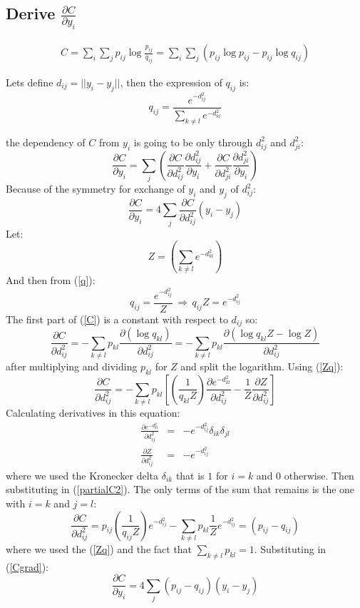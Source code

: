 \documentclass{article}
\begin{document}
\subsection{Derive $\frac{\partial C}{\partial y_{i}}$}
\begin{align}
\label{C}
C=\sum_i\sum_j p_{ij}\log \frac{p_{ij}}{q_{ij}}= \sum_i\sum_j (p_{ij}\log p_{ij}-p_{ij}\log q_{ij})
\end{align}

Lets define $d_{ij}=|| y_i -y_j ||$, then the expression of $q_{ij}$ is:
\begin{equation}\label{q}
q_{ij} =\frac{e^{-d_{ij}^2}}{\sum_{k\neq l} e^{-d_{kl}^2}}
\end{equation}

the dependency of $C$ from $y_i$ is going to be only through $d_{ij}^2$ and $d_{ji}^2$:
 $$
 \frac{\partial C}{\partial y_i}= \sum_j( \frac{\partial C}{\partial d_{ij}^2}\frac{\partial{d_{ij}^2}}{\partial y_i}+ \frac{\partial C}{\partial d_{ji}^2}\frac{\partial{d_{ji}^2}}{\partial y_i})
 $$
Because of the symmetry for exchange of $y_i$ and $y_j$ of $d_{ij}^2$:
 \begin{equation}
 \frac{\partial C}{\partial y_i}= 4\sum_j \frac{\partial C}{\partial d_{ij}^2}(y_i-y_j)
 \end{equation}\label{Cgrad}
 Let:
 \begin{equation}\label{Z}
 Z=(\sum_{k\neq l} e^{-d_{kl}^2})
 \end{equation}
 And then from (\ref{q}):
 \begin{equation}\label{Zq}
 q_{ij} =\frac{e^{-d_{ij}^2}}{Z}\,\Rightarrow \,  q_{ij}Z=e^{-d_{ij}^2}
 \end{equation}
 The first part of (\ref{C}) is a constant with respect to $d_{ij}$ so:
 $$
 \frac{\partial C}{\partial d_{ij}^2}=-\sum_{k\neq l} p_{kl}\frac{\partial(\log q_{kl})}{\partial d_{ij}^2}=
 -\sum_{k\neq l} p_{kl}\frac{\partial(\log q_{kl}Z - \log Z)}{\partial d_{ij}^2}
 $$
 after multiplying and dividing $p_{kl}$  for $Z$ and split the logarithm. Using (\ref{Zq}):
 \begin{equation}\label{partialC2}
  \frac{\partial C}{\partial d_{ij}^2}=-\sum_{k\neq l} p_{kl}[(\frac{1}{q_{kl}Z})\frac{\partial e^{-d_{kl}^2}}{\partial d_{ij}^2} -\frac{1}{Z}\frac{\partial Z}{\partial d_{ij}^2}]
 \end{equation}
 Calculating derivatives in this equation:
  \begin{eqnarray*}
 \frac{\partial e^{-d_{kl}^2}}{\partial d_{ij}^2} & = & -e^{-d_{ij}^2} \delta_{ik}\delta_{jl}\\
 \frac{\partial Z}{\partial d_{ij}^2}& = & -e^{-d_{ij}^2} 
  \end{eqnarray*}
where we used the Kronecker delta   $\delta_{ik}$ that is $1$ for $i=k$ and $0$ otherwise. Then substituting in (\ref{partialC2}). The only terms of the sum that remains is the one with $i=k$ and $j=l$:
$$
  \frac{\partial C}{\partial d_{ij}^2} = p_{ij}(\frac{1}{q_{ij}Z}) e^{-d_{ij}^2} -
  \sum_{k \neq l} p_{kl}\frac{1}{Z}e^{-d_{ij}^2}=(p_{ij}- q_{ij})$$
where we used the (\ref{Zq}) and the fact that   $\sum_{k \neq l} p_{kl}=1$. Substituting in (\ref{Cgrad}):
$$
 \frac{\partial C}{\partial y_i}= 4\sum_j (p_{ij}- q_{ij})(y_i-y_j)
$$
\end{document}
